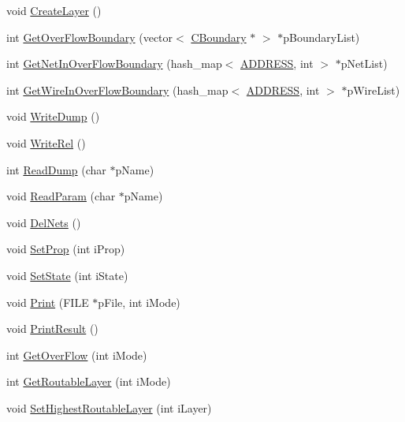 \begin{DoxyCompactItemize}
void \mbox{\hyperlink{classCDesign_af116ba8573daa936d633b5ea0b005637}{Create\+Layer}} ()
\item 
int \mbox{\hyperlink{classCDesign_af264117726c361d0404dcd97c6da2c35}{Get\+Over\+Flow\+Boundary}} (vector$<$ \mbox{\hyperlink{classCBoundary}{C\+Boundary}} $\ast$ $>$ $\ast$p\+Boundary\+List)
\item 
int \mbox{\hyperlink{classCDesign_ab3fcdbedca2a1f107507ec6bd7f4677a}{Get\+Net\+In\+Over\+Flow\+Boundary}} (hash\+\_\+map$<$ \mbox{\hyperlink{BoxRouter_8h_a280feb883e9d4a7edcc69c8bcb9f38f2}{A\+D\+D\+R\+E\+SS}}, int $>$ $\ast$p\+Net\+List)
\item 
int \mbox{\hyperlink{classCDesign_acd4fc20284f55855b4e88d89cc03b058}{Get\+Wire\+In\+Over\+Flow\+Boundary}} (hash\+\_\+map$<$ \mbox{\hyperlink{BoxRouter_8h_a280feb883e9d4a7edcc69c8bcb9f38f2}{A\+D\+D\+R\+E\+SS}}, int $>$ $\ast$p\+Wire\+List)
\item 
void \mbox{\hyperlink{classCDesign_a984162e6e0b47da02f4a34e176f0a569}{Write\+Dump}} ()
\item 
void \mbox{\hyperlink{classCDesign_a69b246b26e9ce4c4edbf74065529b89f}{Write\+Rel}} ()
\item 
int \mbox{\hyperlink{classCDesign_add678d74b22a8bd58dec921656454bdd}{Read\+Dump}} (char $\ast$p\+Name)
\item 
void \mbox{\hyperlink{classCDesign_a91266987b4edb768fb3187e92a9cfbbd}{Read\+Param}} (char $\ast$p\+Name)
\item 
void \mbox{\hyperlink{classCDesign_a02442687ac58142d9e5b0a5886ee8285}{Del\+Nets}} ()
\item 
void \mbox{\hyperlink{classCDesign_afc3a5c7e4453c76a44eec25c38c72135}{Set\+Prop}} (int i\+Prop)
\item 
void \mbox{\hyperlink{classCDesign_adda7bcca7062f58a27baa043bd315bfd}{Set\+State}} (int i\+State)
\item 
void \mbox{\hyperlink{classCDesign_ae6f1b5262fb9420660bd768cb7ae613e}{Print}} (F\+I\+LE $\ast$p\+File, int i\+Mode)
\item 
void \mbox{\hyperlink{classCDesign_af1fc7df15f389d8051d74c7867d3d6be}{Print\+Result}} ()
\item 
int \mbox{\hyperlink{classCDesign_affc3b0b72b0991118a2141e11cbdab6e}{Get\+Over\+Flow}} (int i\+Mode)
\item 
int \mbox{\hyperlink{classCDesign_a0612a39d1690b74618229f2b88a8ccb0}{Get\+Routable\+Layer}} (int i\+Mode)
\item 
void \mbox{\hyperlink{classCDesign_a4dda519df38cb104e804522f76d826fe}{Set\+Highest\+Routable\+Layer}} (int i\+Layer)

\end{DoxyCompactItemize}
